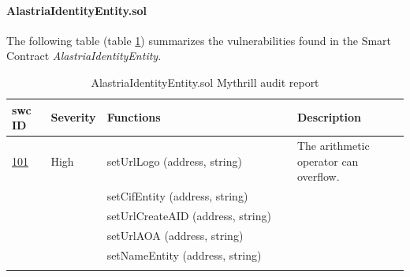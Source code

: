 \documentclass[a4paper, 12pt]{article} %
\begin{document}
            \paragraph{AlastriaIdentityEntity.sol}
                The following table (table \ref{tab:AlastriaIdentityEntity}) summarizes the vulnerabilities found in the Smart Contract \textit{AlastriaIdentityEntity}.
                \begin{longtable}{||p{0.1\linewidth} | p{0.11\linewidth} | p{0.5\linewidth} | p{0.3\linewidth}||}
                    \hline
                    \textbf{\acrshort{swc} ID} & \textbf{Severity} & \textbf{Functions} & \textbf{Description} \\ [0.5ex] 
                    \hline\hline
                    \href{https://swcregistry.io/docs/SWC-101}{101} & High & setUrlLogo (address, string) & The arithmetic operator can overflow. \\
                    \cline{3-3}
                    & & setCifEntity (address, string)  &\\
                    \cline{3-3}
                    & & setUrlCreateAID (address, string) &\\
                    \cline{3-3}
                    & & setUrlAOA (address, string) &\\
                    \cline{3-3}
                    & & setNameEntity (address, string) &\\[1ex] 
                    \hline
                    \caption{AlastriaIdentityEntity.sol Mythrill audit report}
                    \label{tab:AlastriaIdentityEntity}
                \end{longtable}
                
\end{document}
